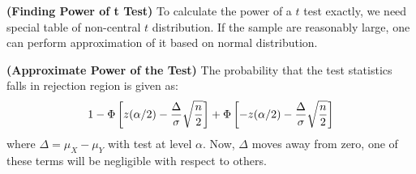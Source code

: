 \begin{remark}{\textbf{(Finding Power of t Test)}}
    To calculate the power of a $t$ test exactly, we need special table of non-central $t$ distribution. If the sample are reasonably large, one can perform approximation of it based on normal distribution. 
\end{remark}

\begin{proposition}{\textbf{(Approximate Power of the Test)}}
    The probability that the test statistics falls in rejection region is given as:
    \begin{equation*}
        1 - \Phi\left[ z(\alpha/2) - \frac{\Delta}{\sigma}\sqrt{\frac{n}{2}} \right] + \Phi\left[ -z(\alpha/2) - \frac{\Delta}{\sigma}\sqrt{\frac{n}{2}} \right]
    \end{equation*}
    where $\Delta = \mu_X - \mu_Y$ with test at level $\alpha$. Now, $\Delta$ moves away from zero, one of these terms will be negligible with respect to others.
\end{proposition}

